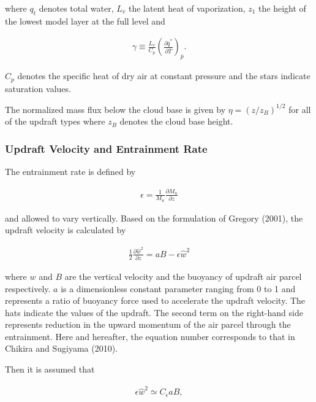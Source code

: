 where \(q_t\) denotes total water, \(L_v\) the latent heat of vaporization, \(z_1\) the height of the lowest model layer at the full level and

\begin{eqnarray}
 \gamma \equiv \frac{L_v}{C_p}\left(\frac{\partial \bar{q}^*}{\partial \bar{T}}\right)_{\bar{p}}.
\end{eqnarray}

\(C_p\) denotes the specific heat of dry air at constant pressure and the stars indicate saturation values.

The normalized mass flux below the cloud base is given by \(\eta = (z/z_B)^{1/2}\) for all of the updraft types where \(z_B\) denotes the cloud base height.

\hypertarget{updraft-velocity-and-entrainment-rate}{%
\subsubsection{Updraft Velocity and Entrainment Rate}\label{updraft-velocity-and-entrainment-rate}}

The entrainment rate is defined by

\begin{eqnarray}
 \epsilon = \frac{1}{M_u}\frac{\partial M_u}{\partial z}
\end{eqnarray}

and allowed to vary vertically. Based on the formulation of Gregory (2001), the updraft velocity is calculated by

\begin{eqnarray}
 \frac{1}{2}\frac{\partial \hat{w}^2}{\partial z} = aB - \epsilon \hat{w}^2 \label{p-cum.1}
\end{eqnarray}

where \(w\) and \(B\) are the vertical velocity and the buoyancy of updraft air parcel respectively. \(a\) is a dimensionless constant parameter ranging from 0 to 1 and represents a ratio of buoyancy
force used to accelerate the updraft velocity. The hats indicate the values of the updraft. The second term on the right-hand side represents reduction in the upward momentum of the air parcel through
the entrainment. Here and hereafter, the equation number corresponds to that in Chikira and Sugiyama (2010).

Then it is assumed that

\begin{eqnarray}
 \epsilon \hat{w}^2 \simeq C_\epsilon a B,
\end{eqnarray}

